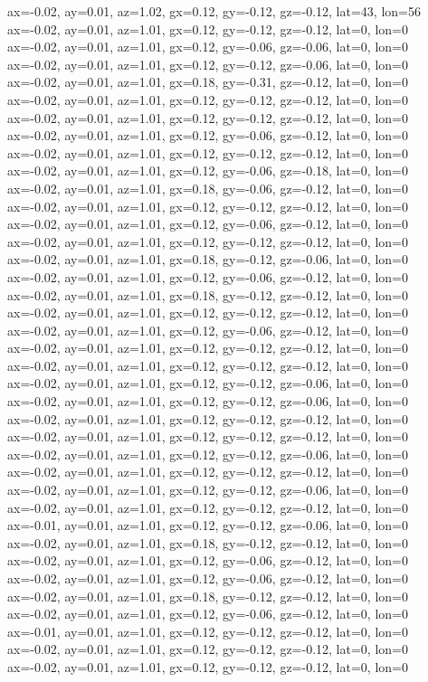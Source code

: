 ax=-0.02, ay=0.01, az=1.02, gx=0.12, gy=-0.12, gz=-0.12, lat=43, lon=56
ax=-0.02, ay=0.01, az=1.01, gx=0.12, gy=-0.12, gz=-0.12, lat=0, lon=0
ax=-0.02, ay=0.01, az=1.01, gx=0.12, gy=-0.06, gz=-0.06, lat=0, lon=0
ax=-0.02, ay=0.01, az=1.01, gx=0.12, gy=-0.12, gz=-0.06, lat=0, lon=0
ax=-0.02, ay=0.01, az=1.01, gx=0.18, gy=-0.31, gz=-0.12, lat=0, lon=0
ax=-0.02, ay=0.01, az=1.01, gx=0.12, gy=-0.12, gz=-0.12, lat=0, lon=0
ax=-0.02, ay=0.01, az=1.01, gx=0.12, gy=-0.12, gz=-0.12, lat=0, lon=0
ax=-0.02, ay=0.01, az=1.01, gx=0.12, gy=-0.06, gz=-0.12, lat=0, lon=0
ax=-0.02, ay=0.01, az=1.01, gx=0.12, gy=-0.12, gz=-0.12, lat=0, lon=0
ax=-0.02, ay=0.01, az=1.01, gx=0.12, gy=-0.06, gz=-0.18, lat=0, lon=0
ax=-0.02, ay=0.01, az=1.01, gx=0.18, gy=-0.06, gz=-0.12, lat=0, lon=0
ax=-0.02, ay=0.01, az=1.01, gx=0.12, gy=-0.12, gz=-0.12, lat=0, lon=0
ax=-0.02, ay=0.01, az=1.01, gx=0.12, gy=-0.06, gz=-0.12, lat=0, lon=0
ax=-0.02, ay=0.01, az=1.01, gx=0.12, gy=-0.12, gz=-0.12, lat=0, lon=0
ax=-0.02, ay=0.01, az=1.01, gx=0.18, gy=-0.12, gz=-0.06, lat=0, lon=0
ax=-0.02, ay=0.01, az=1.01, gx=0.12, gy=-0.06, gz=-0.12, lat=0, lon=0
ax=-0.02, ay=0.01, az=1.01, gx=0.18, gy=-0.12, gz=-0.12, lat=0, lon=0
ax=-0.02, ay=0.01, az=1.01, gx=0.12, gy=-0.12, gz=-0.12, lat=0, lon=0
ax=-0.02, ay=0.01, az=1.01, gx=0.12, gy=-0.06, gz=-0.12, lat=0, lon=0
ax=-0.02, ay=0.01, az=1.01, gx=0.12, gy=-0.12, gz=-0.12, lat=0, lon=0
ax=-0.02, ay=0.01, az=1.01, gx=0.12, gy=-0.12, gz=-0.12, lat=0, lon=0
ax=-0.02, ay=0.01, az=1.01, gx=0.12, gy=-0.12, gz=-0.06, lat=0, lon=0
ax=-0.02, ay=0.01, az=1.01, gx=0.12, gy=-0.12, gz=-0.06, lat=0, lon=0
ax=-0.02, ay=0.01, az=1.01, gx=0.12, gy=-0.12, gz=-0.12, lat=0, lon=0
ax=-0.02, ay=0.01, az=1.01, gx=0.12, gy=-0.12, gz=-0.12, lat=0, lon=0
ax=-0.02, ay=0.01, az=1.01, gx=0.12, gy=-0.12, gz=-0.06, lat=0, lon=0
ax=-0.02, ay=0.01, az=1.01, gx=0.12, gy=-0.12, gz=-0.12, lat=0, lon=0
ax=-0.02, ay=0.01, az=1.01, gx=0.12, gy=-0.12, gz=-0.06, lat=0, lon=0
ax=-0.02, ay=0.01, az=1.01, gx=0.12, gy=-0.12, gz=-0.12, lat=0, lon=0
ax=-0.01, ay=0.01, az=1.01, gx=0.12, gy=-0.12, gz=-0.06, lat=0, lon=0
ax=-0.02, ay=0.01, az=1.01, gx=0.18, gy=-0.12, gz=-0.12, lat=0, lon=0
ax=-0.02, ay=0.01, az=1.01, gx=0.12, gy=-0.06, gz=-0.12, lat=0, lon=0
ax=-0.02, ay=0.01, az=1.01, gx=0.12, gy=-0.06, gz=-0.12, lat=0, lon=0
ax=-0.02, ay=0.01, az=1.01, gx=0.18, gy=-0.12, gz=-0.12, lat=0, lon=0
ax=-0.02, ay=0.01, az=1.01, gx=0.12, gy=-0.06, gz=-0.12, lat=0, lon=0
ax=-0.01, ay=0.01, az=1.01, gx=0.12, gy=-0.12, gz=-0.12, lat=0, lon=0
ax=-0.02, ay=0.01, az=1.01, gx=0.12, gy=-0.12, gz=-0.12, lat=0, lon=0
ax=-0.02, ay=0.01, az=1.01, gx=0.12, gy=-0.12, gz=-0.12, lat=0, lon=0
